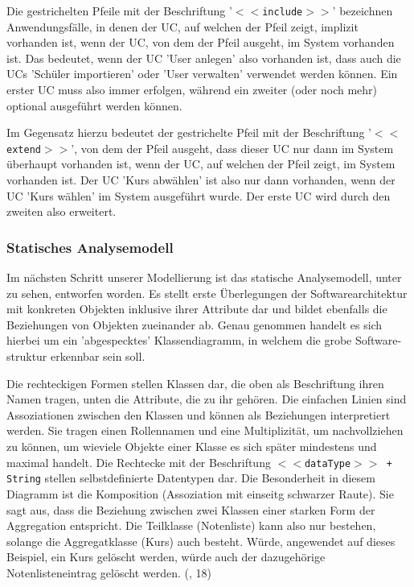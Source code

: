 Die gestrichelten Pfeile mit der Beschriftung '\texttt{$<<$include$>>$}' bezeichnen Anwendungsfälle, in denen der \ac{UC}, auf welchen der Pfeil zeigt, implizit vorhanden ist, wenn der \ac{UC}, von dem der Pfeil ausgeht, im System vorhanden ist. Das bedeutet, wenn der \ac{UC} 'User anlegen' also vorhanden ist, dass auch die \ac{UC}s 'Schüler importieren' oder 'User verwalten' verwendet werden können. Ein erster \ac{UC} muss also immer erfolgen, während ein zweiter (oder noch mehr) optional ausgeführt werden können.

Im Gegensatz hierzu bedeutet der gestrichelte Pfeil mit der Beschriftung '\texttt{$<<$extend$>>$}', von dem der Pfeil ausgeht, dass dieser \ac{UC} nur dann im System überhaupt vorhanden ist, wenn der \ac{UC}, auf welchen der Pfeil zeigt, im System vorhanden ist. Der \ac{UC} 'Kurs abwählen' ist also nur dann vorhanden, wenn der \ac{UC} 'Kurs wählen' im System ausgeführt wurde. Der erste \ac{UC} wird durch den zweiten also erweitert.

\subsubsection{Statisches Analysemodell}

Im nächsten Schritt unserer Modellierung ist das statische Analysemodell, unter  zu sehen, entworfen worden. Es stellt erste Überlegungen der Softwarearchitektur mit konkreten Objekten inklusive ihrer Attribute dar und bildet ebenfalls die Beziehungen von Objekten zueinander ab. Genau genommen handelt es sich hierbei um ein 'abgespecktes' Klassendiagramm, in welchem die grobe Software-struktur erkennbar sein soll.

Die rechteckigen Formen stellen Klassen dar, die oben als Beschriftung ihren Namen tragen, unten die Attribute, die zu ihr gehören. Die einfachen Linien sind Assoziationen zwischen den Klassen und können als Beziehungen interpretiert werden. Sie tragen einen Rollennamen und eine Multiplizität, um nachvollziehen zu können, um wieviele Objekte einer Klasse es sich später mindestens und maximal handelt.
Die Rechtecke mit der Beschriftung \texttt{$<<$dataType$>>$ + String} stellen selbstdefinierte Datentypen dar.
Die Besonderheit in diesem Diagramm ist die Komposition (Assoziation mit einseitg schwarzer Raute). Sie sagt aus, dass die Beziehung zwischen zwei Klassen einer starken Form der Aggregation entspricht. Die Teilklasse (Notenliste) kann also nur bestehen, solange die Aggregatklasse (Kurs) auch besteht. Würde, angewendet auf dieses Beispiel, ein Kurs gelöscht werden, würde auch der dazugehörige Notenlisteneintrag gelöscht werden. (\cite{BalzertH-UML2}, 18)

